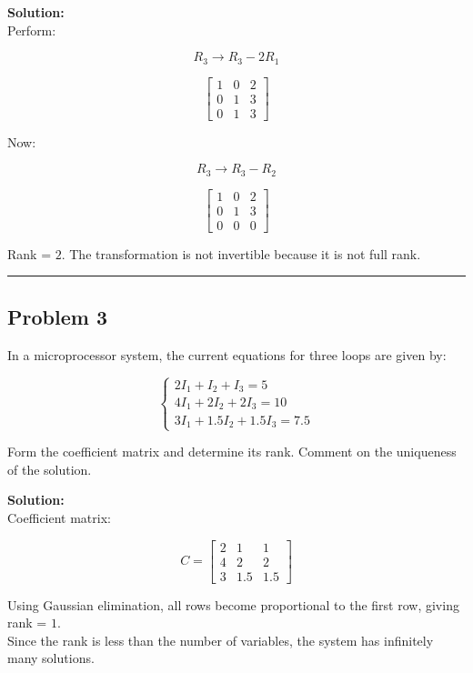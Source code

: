 \documentclass[
  letterpaper,
  DIV=11,
  numbers=noendperiod]{scrreprt}
\begin{document}
\textbf{Solution:}\\
Perform:

\[
R_3 \to R_3 - 2R_1
\]

\[
\begin{bmatrix}
1 & 0 & 2 \\
0 & 1 & 3 \\
0 & 1 & 3
\end{bmatrix}
\]

Now:

\[
R_3 \to R_3 - R_2
\]

\[
\begin{bmatrix}
1 & 0 & 2 \\
0 & 1 & 3 \\
0 & 0 & 0
\end{bmatrix}
\]

Rank = \(2\). The transformation is not invertible because it is not
full rank.

\begin{center}\rule{0.5\linewidth}{0.5pt}\end{center}

\subsection{Problem 3}\label{problem-3-1}

In a microprocessor system, the current equations for three loops are
given by:

\[
\begin{cases}
2I_1 + I_2 + I_3 = 5 \\
4I_1 + 2I_2 + 2I_3 = 10 \\
3I_1 + 1.5I_2 + 1.5I_3 = 7.5
\end{cases}
\]

Form the coefficient matrix and determine its rank. Comment on the
uniqueness of the solution.

\textbf{Solution:}\\
Coefficient matrix:

\[
C =
\begin{bmatrix}
2 & 1 & 1 \\
4 & 2 & 2 \\
3 & 1.5 & 1.5
\end{bmatrix}
\]

Using Gaussian elimination, all rows become proportional to the first
row, giving rank = \(1\).\\
Since the rank is less than the number of variables, the system has
infinitely many solutions.
\end{document}
